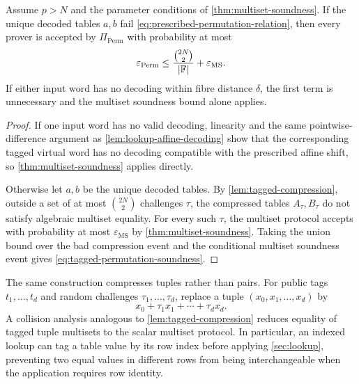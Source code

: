 \begin{theorem}
\label{thm:tagged-permutation-soundness}
Assume $p>N$ and the parameter conditions of \cref{thm:multiset-soundness}.  If the unique decoded tables $a,b$ fail \eqref{eq:prescribed-permutation-relation}, then every prover is accepted by $\Pi_{\mathrm{Perm}}$ with probability at most
\begin{equation}
  \varepsilon_{\mathrm{Perm}}
  \le
  \frac{\binom{2N}{2}}{|\mathbb{F}|}
  +\varepsilon_{\mathrm{MS}}.
  \label{eq:tagged-permutation-soundness}
\end{equation}
If either input word has no decoding within fibre distance $\delta$, the first term is unnecessary and the multiset soundness bound alone applies.
\end{theorem}

\begin{proof}
If one input word has no valid decoding, linearity and the same pointwise-difference argument as \cref{lem:lookup-affine-decoding} show that the corresponding tagged virtual word has no decoding compatible with the prescribed affine shift, so \cref{thm:multiset-soundness} applies directly.

Otherwise let $a,b$ be the unique decoded tables.  By \cref{lem:tagged-compression}, outside a set of at most $\binom{2N}{2}$ challenges $\tau$, the compressed tables $A_\tau,B_\tau$ do not satisfy algebraic multiset equality.  For every such $\tau$, the multiset protocol accepts with probability at most $\varepsilon_{\mathrm{MS}}$ by \cref{thm:multiset-soundness}.  Taking the union bound over the bad compression event and the conditional multiset soundness event gives \eqref{eq:tagged-permutation-soundness}.
\end{proof}

\begin{remark}
\label{rem:tuple-tags-indexed-lookup}
The same construction compresses tuples rather than pairs.  For public tags $t_1,\ldots,t_d$ and random challenges $\tau_1,\ldots,\tau_d$, replace a tuple $(x_0,x_1,\ldots,x_d)$ by
\[
  x_0+\tau_1x_1+\cdots+\tau_dx_d.
\]
A collision analysis analogous to \cref{lem:tagged-compression} reduces equality of tagged tuple multisets to the scalar multiset protocol.  In particular, an indexed lookup can tag a table value by its row index before applying \cref{sec:lookup}, preventing two equal values in different rows from being interchangeable when the application requires row identity.
\end{remark}

